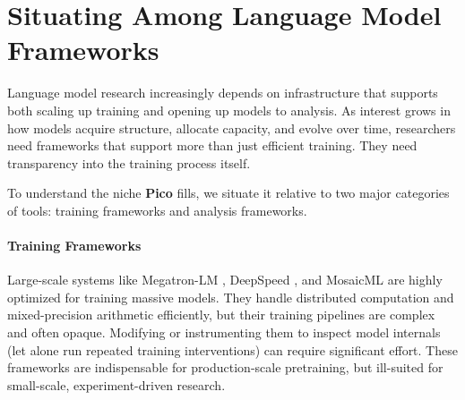 \section[Situating \picomed Among Language Model Frameworks]{Situating \picolarge Among Language Model Frameworks}
\label{sec:pico-related}

Language model research increasingly depends on infrastructure that supports both scaling up training and opening up models to analysis. As interest grows in how models acquire structure, allocate capacity, and evolve over time, researchers need frameworks that support more than just efficient training. They need transparency into the training process itself.

To understand the niche \textbf{Pico} fills, we situate it relative to two major categories of tools: training frameworks and analysis frameworks.


\paragraph{Training Frameworks}
Large-scale systems like Megatron-LM \citep{narayanan2021megatron}, DeepSpeed \citep{rasley2020deepspeed}, and MosaicML \citep{mosaic2023mpt} are highly optimized for training massive models. They handle distributed computation and mixed-precision arithmetic efficiently, but their training pipelines are complex and often opaque. Modifying or instrumenting them to inspect model internals (let alone run repeated training interventions) can require significant effort. These frameworks are indispensable for production-scale pretraining, but ill-suited for small-scale, experiment-driven research.

